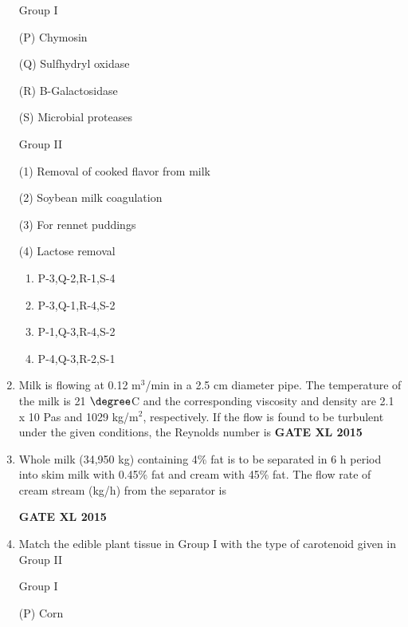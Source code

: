 \documentclass[journal,12pt,onecolumn]{IEEEtran}
\begin{document}
\begin{enumerate}
	\begin{minipage}{0.5\textwidth}\begin{flushleft}
Group I

		(P) Chymosin

		(Q) Sulfhydryl oxidase

		(R) B-Galactosidase

		(S) Microbial proteases
	\end{flushleft}
	\end{minipage}
	\begin{minipage}{0.5\textwidth}\begin{flushleft}
Group II

		(1) Removal of cooked flavor from milk

		(2) Soybean milk coagulation

		(3) For rennet puddings

		(4) Lactose removal
	\end{flushleft}

	\end{minipage}

    \begin{enumerate}
            \item P-3,Q-2,R-1,S-4
            \item P-3,Q-1,R-4,S-2
            \item P-1,Q-3,R-4,S-2
            \item P-4,Q-3,R-2,S-1
    \end{enumerate}
\item Milk is flowing at 0.12 m$^3$/min in a 2.5 cm diameter pipe. The temperature of the milk is 21 $\degree$C and the corresponding viscosity and density are 2.1 x 10 Pas and 1029 kg/m$^2$, respectively. If the flow is found to be turbulent under the given conditions, the Reynolds number is
\hfill{\textbf{GATE XL 2015}}
\item Whole milk (34,950 kg) containing 4\% fat is to be separated in 6 h period into skim milk with 0.45\% fat and cream with 45\% fat. The flow rate of cream stream (kg/h) from the separator is


	\hfill{\textbf{GATE XL 2015}}
\item Match the edible plant tissue in Group I with the type of carotenoid given in Group II

	\begin{minipage}{0.5\textwidth}\begin{flushleft}
Group I

		(P) Corn


\end{flushleft}
\end{minipage}
\end{enumerate}
\end{document}
